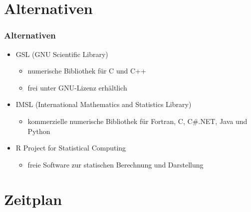 \documentclass{beamer}
\begin{document}
\section{Alternativen}

\begin{frame}
 \frametitle{Alternativen}
 \begin{itemize}
  \item GSL (GNU Scientific Library)
   \begin{itemize}
    \item numerische Bibliothek f\"ur C und  C++
    \item frei unter GNU-Lizenz erh\"altlich
   \end{itemize}
  \item IMSL (International Mathematics and Statistics Library)
   \begin{itemize}
    \item kommerzielle numerische Bibliothek f\"ur Fortran, C, C\#.NET, Java und Python
   \end{itemize}
  \item R Project for Statistical Computing
  \begin{itemize}
    \item freie Software zur statischen Berechnung und Darstellung
   \end{itemize}
 \end{itemize}

\end{frame}


\section{Zeitplan}
\end{document}
